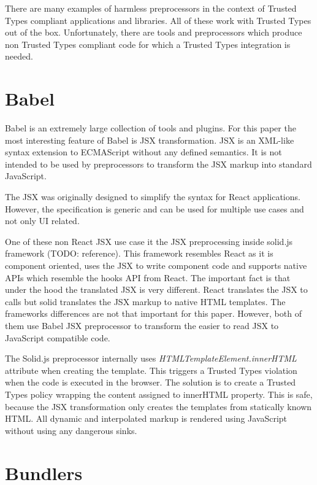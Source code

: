 There are many examples of harmless preprocessors in the context of Trusted Types compliant
applications and libraries. All of these work with Trusted Types out of the box. Unfortunately,
there are tools and preprocessors which produce non Trusted Types compliant code for which a Trusted
Types integration is needed.

\section{Babel}

Babel is an extremely large collection of tools and plugins. For this paper the most interesting
feature of Babel is JSX transformation. JSX is an XML-like syntax extension to ECMAScript without
any defined semantics. It is not intended to be used by preprocessors to transform the JSX markup
into standard JavaScript.

The JSX was originally designed to simplify the syntax for React applications. However, the
specification \cite{jsx_spec} is generic and can be used for multiple use cases and not only UI
related.

One of these non React JSX use case it the JSX preprocessing inside solid.js framework (TODO:
reference). This framework resembles React as it is component oriented, uses the JSX to write
component code and supports native APIs which resemble the hooks API from React. The important fact
is that under the hood the translated JSX is very different. React translates the JSX to
 calls but solid translates the JSX markup to native HTML templates. The
frameworks differences are not that important for this paper. However, both of them use Babel JSX
preprocessor to transform the easier to read JSX to JavaScript compatible code.

The Solid.js preprocessor internally uses \textit{HTMLTemplateElement.innerHTML} attribute when
creating the template. This triggers a Trusted Types violation when the code is executed in the
browser. The solution is to create a Trusted Types policy wrapping the content assigned to innerHTML
property. This is safe, because the JSX transformation only creates the templates from statically
known HTML. All dynamic and interpolated markup is rendered using JavaScript without using any
dangerous sinks.


\section{Bundlers}

